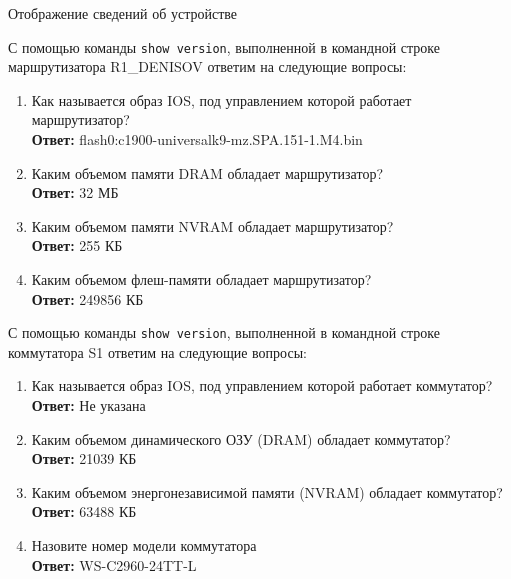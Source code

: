\documentclass[a4paper,14pt]{extarticle}
\begin{document}
\begin{mypart}{Отображение сведений об устройстве}


С помощью команды \texttt{show version}, выполненной в командной строке маршрутизатора R1\_DENISOV ответим на следующие вопросы:
\begin{enumerate}
	\item Как называется образ IOS, под управлением которой работает маршрутизатор?
		\\\textbf{Ответ:} flash0:c1900-universalk9-mz.SPA.151-1.M4.bin
	\item Каким объемом памяти DRAM обладает маршрутизатор?
		\\\textbf{Ответ:} 32 МБ
	\item Каким объемом памяти NVRAM обладает маршрутизатор?
		\\\textbf{Ответ:} 255 КБ
	\item Каким объемом флеш-памяти обладает маршрутизатор?
		\\\textbf{Ответ:} 249856 КБ
	
\end{enumerate}

С помощью команды \texttt{show version}, выполненной в командной строке коммутатора S1 ответим на следующие вопросы:
\begin{enumerate}
	\item Как называется образ IOS, под управлением которой работает коммутатор?
		\\\textbf{Ответ:} Не указана
	\item Каким объемом динамического ОЗУ (DRAM) обладает коммутатор?
		\\\textbf{Ответ:} 21039 КБ
	\item Каким объемом энергонезависимой памяти (NVRAM) обладает коммутатор?
		\\\textbf{Ответ:} 63488 КБ
	\item Назовите номер модели коммутатора
		\\\textbf{Ответ:} WS-C2960-24TT-L
\end{enumerate}



\end{mypart}
\end{document}
